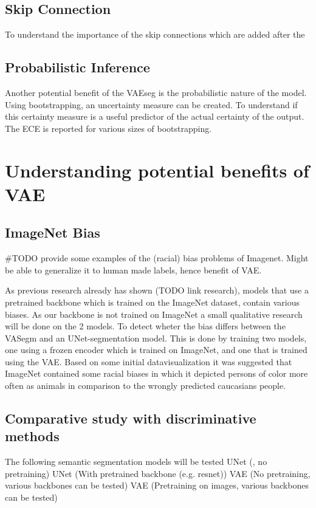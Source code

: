 \subsection{Skip Connection}
To understand the importance of the skip connections which are added after the 

\subsection{Probabilistic Inference}
Another potential benefit of the VAEseg is the probabilistic nature of the model. Using bootstrapping, an uncertainty measure can be created. To understand if this certainty measure is a useful predictor of the actual certainty of the output. The ECE is reported for various sizes of bootstrapping.

\section{Understanding potential benefits of VAE}
\subsection*{ImageNet Bias}
\#TODO provide some examples of the (racial) bias problems of Imagenet. Might be able to generalize it to human made labels, hence benefit of VAE.

As previous research already has shown (TODO link research), models that use a pretrained backbone which is trained on the ImageNet dataset, contain various biases. As our backbone is not trained on ImageNet a small qualitative research will be done on the 2 models. To detect wheter the bias differs between the VASegm and an UNet-segmentation model. This is done by training two models, one using a frozen encoder which is trained on ImageNet, and one that is trained using the VAE. Based on some initial datavisualization it was suggested that ImageNet contained some racial biases in which it depicted persons of color more often as animals in comparison to the wrongly predicted caucasians people.

\subsection{}

\subsection*{Comparative study with discriminative methods}
The following semantic segmentation models will be tested
UNet (\cite{ronneberger2015u}, no pretraining)
UNet (With pretrained backbone (e.g. resnet))
VAE (No pretraining, various backbones can be tested)
VAE (Pretraining on images, various backbones can be tested)

